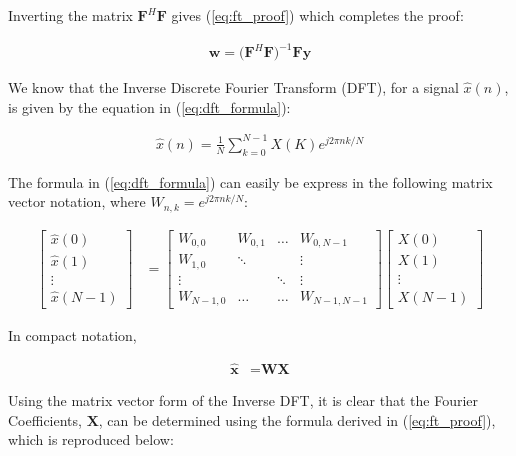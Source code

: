 \noindent{}Inverting the matrix $\textbf{F}^H\textbf{F}$ gives (\ref{eq:ft_proof}) which completes the proof:

\begin{align}
\textbf{w} = \big(\textbf{F}^H\textbf{F}\big)^{-1} \textbf{F}\textbf{y} \label{eq:ft_proof}
\end{align}

\noindent{}We know that the Inverse Discrete Fourier Transform (DFT), for a signal $\hat{x}(n)$, is given by the equation in (\ref{eq:dft_formula}):

\begin{align}
\hat{x}(n) = \frac{1}{N} \sum_{k=0}^{N-1}X(K)e^{j2\pi n k / N} \label{eq:dft_formula}
\end{align}

\noindent{}The formula in (\ref{eq:dft_formula}) can easily be express in the following matrix vector notation, where $W_{n,k}=e^{j2\pi n k / N}$:

\begin{align*}
\begin{bmatrix}
\hat{x}(0) \\
\hat{x}(1) \\
\vdots\\
\hat{x}(N-1)
\end{bmatrix}
&=
\begin{bmatrix}
    W_{0,0}		& W_{0,1} 	& \dots	& W_{0,N-1} \\
    W_{1,0} 		& \ddots  	&		& \vdots		\\
   	\vdots		& 			& \ddots	& \vdots		\\
   	W_{N-1,0} 	& \dots 		& \dots	& W_{N-1,N-1}
\end{bmatrix} 
\begin{bmatrix}
X(0) \\
X(1) \\
\vdots \\
X(N-1)
\end{bmatrix}
\end{align*}

\noindent{}In compact notation, 

\begin{align*}
\hat{\textbf{x}} &= \textbf{W}\textbf{X}
\end{align*}

\noindent{}Using the matrix vector form of the Inverse DFT, it is clear that the Fourier Coefficients, $\textbf{X}$, can be determined using the formula derived in (\ref{eq:ft_proof}), which is reproduced below:


